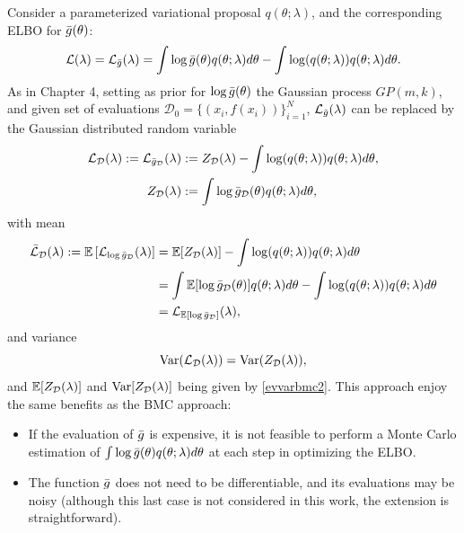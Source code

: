 Consider a parameterized variational proposal $q(\theta;\lambda)$, and the corresponding ELBO for ${\bar{g}}(\theta)$:
\begin{displaymath}
 \mathcal{L}(\lambda) = \mathcal{L}_{\bar{g}}(\lambda) = \int \log {\bar{g}}(\theta) q(\theta;\lambda) d\theta - \int \log(q(\theta;\lambda)) q(\theta;\lambda) d\theta.
\end{displaymath}
As in Chapter 4, setting as prior for $\log {\bar{g}}(\theta)$ the Gaussian process $GP(m,k)$, and given set of evaluations $\mathcal{D}_0 = \{(x_i,f(x_i))\}_{i=1}^N$, $\mathcal{L}_{\bar{g}}(\lambda)$ can be replaced by the Gaussian distributed random variable
\begin{equation}\label{vbmc_rvs}
\begin{split}
\mathcal{L}_\mathcal{D}(\lambda) := \mathcal{L}_{{\bar{g}}_\mathcal{D}}(\lambda) &:= Z_\mathcal{D}(\lambda) - \int \log(q(\theta;\lambda)) q(\theta;\lambda) d\theta, \\
Z_\mathcal{D}(\lambda) & := \int \log {\bar{g}}_\mathcal{D}(\theta) q(\theta;\lambda) d\theta,
\end{split}
\end{equation}
with mean
\begin{equation}
\begin{split}
\bar{\mathcal{L}}_\mathcal{D}(\lambda) := {\mathbb E} \left[ \mathcal{L}_{\log {\bar{g}}_\mathcal{D}}(\lambda) \right] & = {\mathbb E}[Z_\mathcal{D}(\lambda)] - \int \log(q(\theta;\lambda)) q(\theta;\lambda) d\theta \\
& = \int {\mathbb E}[\log {\bar{g}}_\mathcal{D}(\theta)] q(\theta;\lambda) d\theta - \int \log(q(\theta;\lambda)) q(\theta;\lambda) d\theta\\
& = \mathcal{L}_{{\mathbb E}[\log {\bar{g}}_\mathcal{D}]} (\lambda), \\
\end{split}
\end{equation}
and variance
\begin{equation}
\mathrm{Var}(\mathcal{L}_\mathcal{D}(\lambda)) = \mathrm{Var}(Z_\mathcal{D}(\lambda)),
\end{equation}
and ${\mathbb E}[Z_\mathcal{D}(\lambda)]$ and $\mathrm{Var}[Z_\mathcal{D}(\lambda)]$ being given by \eqref{evvarbmc2}.
This approach enjoy the same benefits as the BMC approach:
\begin{itemize}
	\item If the evaluation of ${\bar{g}}$ is expensive, it is not feasible to perform a Monte Carlo estimation of $\int \log {\bar{g}}(\theta) q (\theta;\lambda) d \theta$ at each step in optimizing the ELBO.
	\item The function ${\bar{g}}$ does not need to be differentiable, and its evaluations may be noisy (although this last case is not considered in this work, the extension is straightforward).
\end{itemize}
